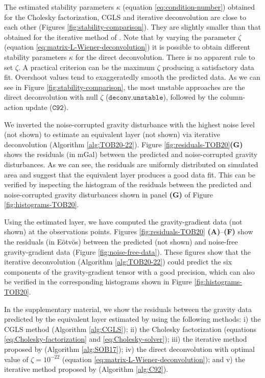 \documentclass[utf8]{FrontiersinHarvard} %
\begin{document}
	The estimated stability parameters $\kappa$ (equation \ref{eq:condition-number}) obtained for the Cholesky factorization, CGLS and
	iterative deconvolution are close to each other (Figures \ref{fig:stability-comparison}).
	They are slightly smaller than that obtained for the iterative method of \citet{siqueira-etal2017}.
	Note that by varying the parameter $\zeta$ (equation \ref{eq:matrix-L-Wiener-deconvolution}) it is possible to obtain different 
	stability parameters $\kappa$ for the direct deconvolution. There is no apparent rule to set $\zeta$.
	A practical criterion can be the maximum $\zeta$ producing a satisfactory data fit. Overshoot values tend to exaggeratedly smooth the 
	predicted data.
	As we can see in Figure \ref{fig:stability-comparison}, the most unstable approaches are the direct deconvolution with null $\zeta$
	($\mathtt{deconv. unstable}$), followed by the column-action update ($\mathtt{C92}$).
	
	We inverted the noise-corrupted gravity disturbance  with the highest noise level (not shown) 
	to estimate an equivalent layer (not shown) via iterative deconvolution (Algorithm \ref{alg:TOB20-22}).
	Figure \ref{fig:residuals-TOB20}\textbf{(G)} shows the residuals (in mGal) between the predicted and noise-corrupted 
	gravity disturbances.
	As we can see, the residuals are uniformly distributed on simulated area and suggest that the equivalent layer
	produces a good data fit.
	This can be verified by inspecting the histogram of the residuals between the predicted and noise-corrupted 
	gravity disturbances shown in panel \textbf{(G)} of Figure \ref{fig:histograms-TOB20}.
	
	Using the estimated layer, we have computed the gravity-gradient data (not shown) at the observations points.
	Figures \ref{fig:residuals-TOB20} \textbf{(A)}--\textbf{(F)} show the residuals (in Eötvös)
	between the predicted (not shown) and noise-free gravity-gradient data 
	(Figure \ref{fig:noise-free-data}).
	These figures show that the iterative deconvolution (Algorithm \ref{alg:TOB20-22}) could predict the six components of the
	gravity-gradient tensor with a good precision, which can also be verified in the corresponding histograms shown in 
	Figure \ref{fig:histograms-TOB20}.
	
	In the supplementary material, we show the residuals between the gravity data predicted by the equivalent layer estimated by using the following methods:
	i)  the CGLS method (Algorithm \ref{alg:CGLS});
	ii) the  Cholesky factorization (equations \ref{eq:Cholesky-factorization} and \ref{eq:Cholesky-solver});
	iii) the iterative method proposed by \citet{siqueira-etal2017} (Algorithm \ref{alg:SOB17});
	iv) the direct deconvolution with  optimal value of $\zeta = 10^{-22}$ 
	(equation \ref{eq:matrix-L-Wiener-deconvolution}); and
	v) the iterative method  proposed by \cite{cordell1992} (Algorithm \ref{alg:C92}).
	
\end{document}
